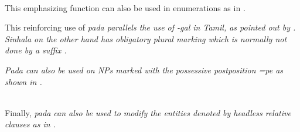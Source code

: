 

\\ 


This emphasizing function can also be used in enumerations as in .



This reinforcing use of \em pada \em  parallels the use of \em -gal \em in Tamil, as pointed out by \citet{SmithRH}. Sinhala on the other hand has obligatory plural marking which is normally not done by a suffix \citep[cf.][]{NitzEtAl}.



\em Pada \em can also be used on NPs marked with the possessive postposition \em =pe \em as shown in .

 \\


Finally, \em pada \em can also be used to modify the entities denoted by headless relative clauses as in .

